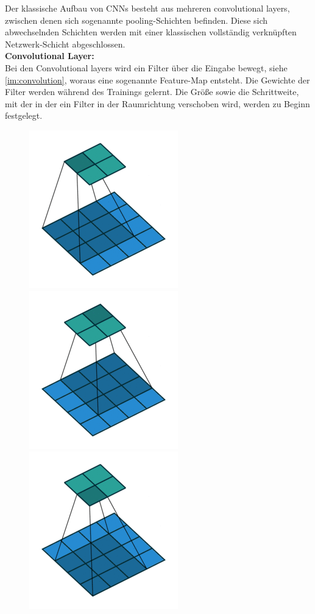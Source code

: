 \documentclass[11pt,a4paper]{article}
\numberwithin{equation}{section}
\begin{document}
	Der klassische Aufbau von CNNs besteht aus mehreren convolutional layers, zwischen denen sich sogenannte pooling-Schichten befinden. Diese sich abwechselnden Schichten werden mit einer klassischen vollständig verknüpften Netzwerk-Schicht abgeschlossen.\\
	
	\noindent\textbf{Convolutional Layer:}\\
	Bei den Convolutional layers wird ein Filter über die Eingabe bewegt, siehe \autoref{im:convolution}, woraus eine sogenannte Feature-Map entsteht. Die Gewichte der Filter werden während des Trainings gelernt. Die Größe sowie die Schrittweite, mit der in der ein Filter in der Raumrichtung verschoben wird, werden zu Beginn festgelegt.
	
	\begin{figure}[ht]
		\centering
		\includegraphics[width=0.1\textheight]{frame_0_delay-1s.png}
		\includegraphics[width=0.1\textheight]{frame_1_delay-1s.png}
		\includegraphics[width=0.1\textheight]{frame_2_delay-1s.png}		

\end{figure}
\end{document}
